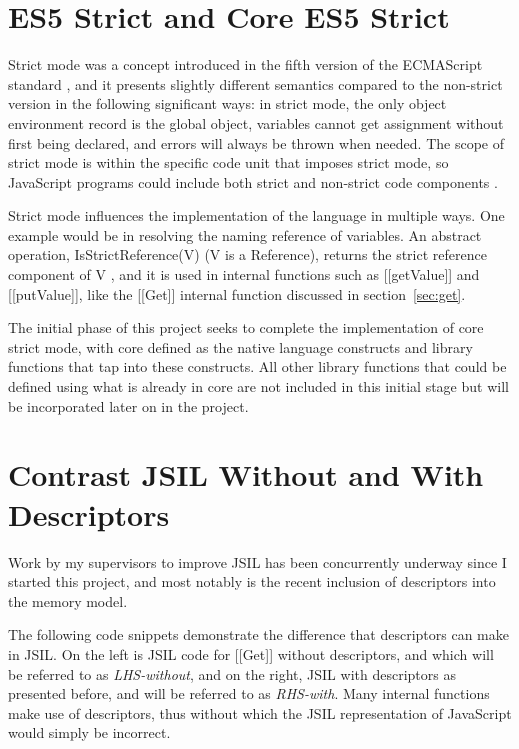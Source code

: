 \documentclass[a4paper,11pt,twoside]{report}
\begin{document}
\section{ES5 Strict and Core ES5 Strict}\label{sec:strict}
Strict mode was a concept introduced in the fifth version of the ECMAScript standard \cite{EcmaScript}, and it presents slightly different semantics compared to the non-strict version in the following significant ways: in strict mode, the only object environment record is the global object, variables cannot get assignment without first being declared, and errors will always be thrown when needed. The scope of strict mode is within the specific code unit that imposes strict mode, so JavaScript programs could include both strict and non-strict code components \cite{EcmaScript}.

Strict mode influences the implementation of the language in multiple ways. One example would be in resolving the naming reference of variables. An abstract operation, IsStrictReference(V) (V is a Reference), returns the strict reference component of V \cite{EcmaScript}, and it is used in internal functions such as [[getValue]] and [[putValue]], like the [[Get]] internal function discussed in section~\ref{sec:get}.

The initial phase of this project seeks to complete the implementation of core strict mode, with core defined as the native language constructs and library functions that tap into these constructs. All other library functions that could be defined using what is already in core are not included in this initial stage but will be incorporated later on in the project.

\section{Contrast JSIL Without and With Descriptors}
Work by my supervisors to improve JSIL has been concurrently underway since I started this project, and most notably is the recent inclusion of descriptors into the memory model.

The following code snippets demonstrate the difference that descriptors can make in JSIL. On the left is JSIL code for [[Get]] without descriptors, and which will be referred to as \textit{LHS-without}, and on the right, JSIL with descriptors as presented before, and will be referred to as \textit{RHS-with}. Many internal functions make use of descriptors, thus without which the JSIL representation of JavaScript would simply be incorrect.
\end{document}
